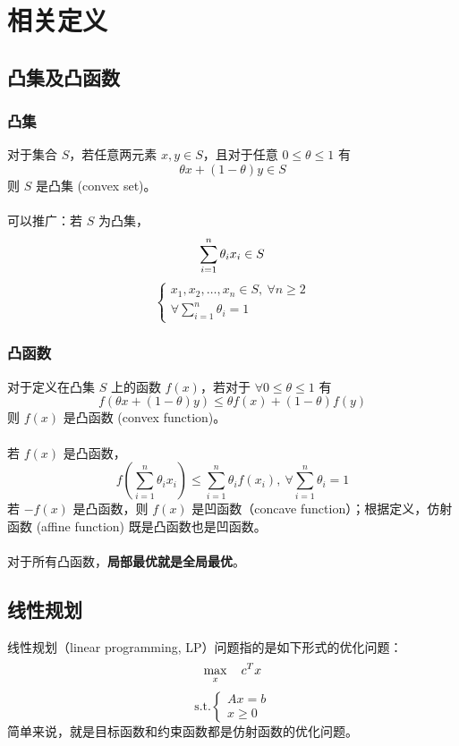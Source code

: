 \section{相关定义}
\subsection{凸集及凸函数}
\subsubsection{凸集}
对于集合 $S$，若任意两元素 $x, y \in S$，且对于任意 $0 \le \theta \le 1$ 有 
$$
\theta x + (1-\theta)y \in S
$$
则 $S$ 是凸集 (convex set)。 \\~\\
可以推广：若 $S$ 为凸集， 
$$
\sum_{i=1}^n \theta_ix_i \in S \\
$$
$$
\begin{cases}
x_1, x_2, \dots, x_n \in S, \  \forall n \ge 2 \\
\forall \sum_{i=1}^n \theta_i = 1
\end{cases}
$$

\subsubsection{凸函数}
对于定义在凸集 $S$ 上的函数 $f(x)$，若对于 $\forall 0 \le \theta \le 1$ 有
$$
f(\theta x + (1-\theta) y) \le \theta f(x) + (1-\theta) f(y)
$$
则 $f(x)$ 是凸函数 (convex function)。 \\~\\
若 $f(x)$ 是凸函数，
$$
f(\sum_{i=1}^n \theta_ix_i) \le \sum_{i=1}^n \theta_i f(x_i), \ \forall \sum_{i=1}^n \theta_i = 1
$$
若 $-f(x)$ 是凸函数，则 $f(x)$ 是凹函数（concave function）；根据定义，仿射函数 (affine function) 既是凸函数也是凹函数。 \\~\\
对于所有凸函数，\textbf{局部最优就是全局最优}。

\subsection{线性规划}
线性规划（linear programming, LP）问题指的是如下形式的优化问题：
$$
\max_{x} \quad c^Tx \\
$$
$$
\text{s.t.} 
\begin{cases}
    Ax = b \\ 
    x \ge 0    
\end{cases}
$$
简单来说，就是目标函数和约束函数都是仿射函数的优化问题。

